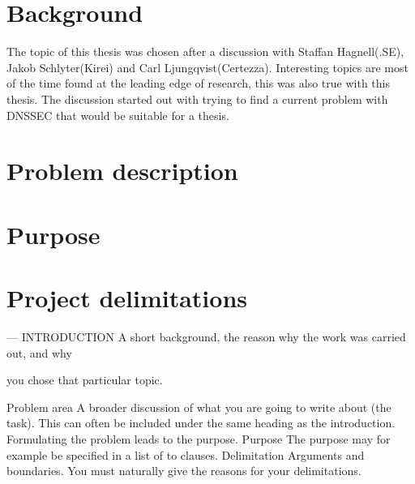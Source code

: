 \section{Background}
The topic of this thesis was chosen after a discussion with Staffan Hagnell(.SE), Jakob Schlyter(Kirei) and Carl Ljungqvist(Certezza).
Interesting topics are most of the time found at the leading edge of research, this was also true with this thesis. The discussion started out with trying to find a current problem with DNSSEC that would be suitable for a thesis.

\section{Problem description}

\section{Purpose}
\section{Project delimitations}


---
INTRODUCTION A short background, the reason why the work was carried out, and why

you chose that particular topic.

 Problem area A broader discussion of what you are going to write about (the task). This
can often be included under the same heading as the introduction. Formulating the problem
leads to the purpose.
 Purpose  The purpose may for example be specified in a list of to clauses.
 Delimitation  Arguments and boundaries. You must naturally give the reasons for your
delimitations.
